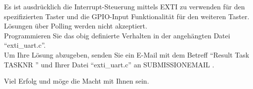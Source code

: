 \documentclass[a4paper,12pt]{article}
\begin{document}
Es ist ausdrücklich die Interrupt-Steuerung mittels EXTI zu verwenden für den spezifizierten Taster und die GPIO-Input Funktionalität für den weiteren Taster. Lösungen über Polling werden nicht akzeptiert.
\\

Programmieren Sie das obig definierte Verhalten in der angeh\"angten Datei \enquote{exti\_uart.c}.
\\

Um Ihre L\"osung abzugeben, senden Sie ein E-Mail mit dem Betreff \enquote{Result Task {{ TASKNR }}} und Ihrer Datei \enquote{exti\_uart.c}  an {{ SUBMISSIONEMAIL }}.

\vspace{0.7cm}

Viel Erfolg und m\"oge die Macht mit Ihnen sein.

\newpage
\printbibliography[heading=bibintoc]
\end{document}
